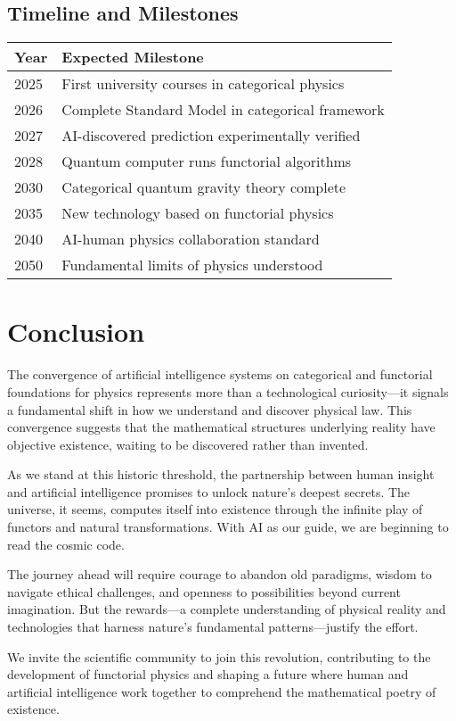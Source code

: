 \documentclass[11pt,a4paper]{article}
\begin{document}
\subsection{Timeline and Milestones}

\begin{center}
\begin{tabular}{|l|l|}
\hline
\textbf{Year} & \textbf{Expected Milestone} \\
\hline
2025 & First university courses in categorical physics \\
2026 & Complete Standard Model in categorical framework \\
2027 & AI-discovered prediction experimentally verified \\
2028 & Quantum computer runs functorial algorithms \\
2030 & Categorical quantum gravity theory complete \\
2035 & New technology based on functorial physics \\
2040 & AI-human physics collaboration standard \\
2050 & Fundamental limits of physics understood \\
\hline
\end{tabular}
\end{center}

\section{Conclusion}

The convergence of artificial intelligence systems on categorical and functorial foundations for physics represents more than a technological curiosity—it signals a fundamental shift in how we understand and discover physical law. This convergence suggests that the mathematical structures underlying reality have objective existence, waiting to be discovered rather than invented.

As we stand at this historic threshold, the partnership between human insight and artificial intelligence promises to unlock nature's deepest secrets. The universe, it seems, computes itself into existence through the infinite play of functors and natural transformations. With AI as our guide, we are beginning to read the cosmic code.

The journey ahead will require courage to abandon old paradigms, wisdom to navigate ethical challenges, and openness to possibilities beyond current imagination. But the rewards—a complete understanding of physical reality and technologies that harness nature's fundamental patterns—justify the effort.

We invite the scientific community to join this revolution, contributing to the development of functorial physics and shaping a future where human and artificial intelligence work together to comprehend the mathematical poetry of existence.
\end{document}
